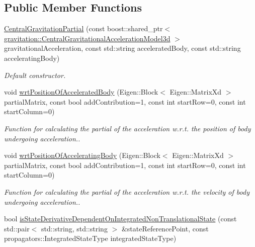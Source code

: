\subsection*{Public Member Functions}
\begin{DoxyCompactItemize}
\item 
\hyperlink{classtudat_1_1acceleration__partials_1_1CentralGravitationPartial_a597e5d40813a54470435be443fc44d60}{Central\+Gravitation\+Partial} (const boost\+::shared\+\_\+ptr$<$ \hyperlink{classtudat_1_1gravitation_1_1CentralGravitationalAccelerationModel}{gravitation\+::\+Central\+Gravitational\+Acceleration\+Model3d} $>$ gravitational\+Acceleration, const std\+::string accelerated\+Body, const std\+::string accelerating\+Body)
\begin{DoxyCompactList}\small\item\em Default constructor. \end{DoxyCompactList}\item 
void \hyperlink{classtudat_1_1acceleration__partials_1_1CentralGravitationPartial_a32b9a3d09a2c6df6102f1e76192457e8}{wrt\+Position\+Of\+Accelerated\+Body} (Eigen\+::\+Block$<$ Eigen\+::\+Matrix\+Xd $>$ partial\+Matrix, const bool add\+Contribution=1, const int start\+Row=0, const int start\+Column=0)
\begin{DoxyCompactList}\small\item\em Function for calculating the partial of the acceleration w.\+r.\+t. the position of body undergoing acceleration.. \end{DoxyCompactList}\item 
void \hyperlink{classtudat_1_1acceleration__partials_1_1CentralGravitationPartial_a7093f71f2e445a31878d3e90f6b02cb4}{wrt\+Position\+Of\+Accelerating\+Body} (Eigen\+::\+Block$<$ Eigen\+::\+Matrix\+Xd $>$ partial\+Matrix, const bool add\+Contribution=1, const int start\+Row=0, const int start\+Column=0)
\begin{DoxyCompactList}\small\item\em Function for calculating the partial of the acceleration w.\+r.\+t. the velocity of body undergoing acceleration.. \end{DoxyCompactList}\item 
bool \hyperlink{classtudat_1_1acceleration__partials_1_1CentralGravitationPartial_a4441f3336bacf890519f0d7eef1913ff}{is\+State\+Derivative\+Dependent\+On\+Integrated\+Non\+Translational\+State} (const std\+::pair$<$ std\+::string, std\+::string $>$ \&state\+Reference\+Point, const propagators\+::\+Integrated\+State\+Type integrated\+State\+Type)

\end{DoxyCompactItemize}
